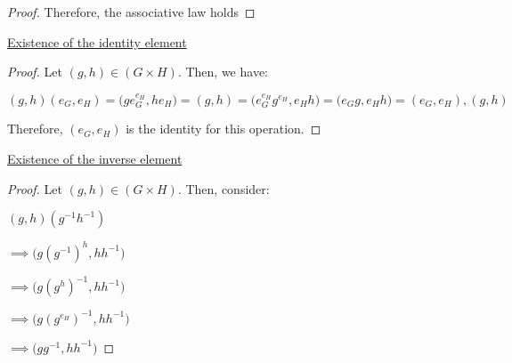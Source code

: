 \documentclass[executivepaper]{article}
\begin{document}
\begin{flushleft}
\begin{center}
\begin{proof}
Therefore, the associative law holds

\end{proof}

\end{center}

\vspace{3mm}

\begin{center}

\underline{Existence of the identity element}

\begin{proof}

Let $(g,h) \in (G \times H)$. Then, we have:

\vspace{3mm}

$(g,h)(e_{G}, e_{H})=\bigg(ge_{G}^{e_{H}}, he_{H}\bigg)=(g,h)=\bigg(e_{G}^{e_{H}}g^{e_{H}}, e_{H}h\bigg)=\bigg(e_{G}g, e_{H}h\bigg)=(e_{G}, e_{H}),(g,h)$

\vspace{3mm}

Therefore, $(e_{G}, e_{H})$ is the identity for this operation.

\end{proof}

\end{center}

\begin{center}

\underline{Existence of the inverse element}

\begin{proof}

Let $(g,h) \in (G \times H)$. Then, consider:

\vspace{3mm}

$(g,h)(g^{-1}h^{-1})$

\vspace{3mm}

$\implies \bigg(g(g^{-1})^{h},hh^{-1}\bigg)$

\vspace{3mm}

$\implies \bigg(g(g^{h})^{-1},hh^{-1}\bigg)$

\vspace{3mm}

$\implies \bigg(g(g^{e_{H}})^{-1},hh^{-1}\bigg)$

\vspace{3mm}

$\implies \bigg(gg^{-1},hh^{-1}\bigg)$


\end{proof}
\end{center}
\end{flushleft}
\end{document}
